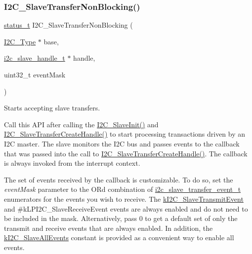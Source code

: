 \subsubsection{\texorpdfstring{I2C\_SlaveTransferNonBlocking()}{I2C\_SlaveTransferNonBlocking()}}
{\footnotesize\ttfamily \mbox{\hyperlink{group__ksdk__common_gaaabdaf7ee58ca7269bd4bf24efcde092}{status\+\_\+t}} I2\+C\+\_\+\+Slave\+Transfer\+Non\+Blocking (\begin{DoxyParamCaption}\item[{\mbox{\hyperlink{struct_i2_c___type}{I2\+C\+\_\+\+Type}} $\ast$}]{base,  }\item[{\mbox{\hyperlink{group__i2c__driver_ga394e5278816efe62815de9d25be84752}{i2c\+\_\+slave\+\_\+handle\+\_\+t}} $\ast$}]{handle,  }\item[{uint32\+\_\+t}]{event\+Mask }\end{DoxyParamCaption})}



Starts accepting slave transfers. 

Call this A\+PI after calling the \mbox{\hyperlink{group__i2c__driver_gaf2397a88554ea896f212dd262f9bc731}{I2\+C\+\_\+\+Slave\+Init()}} and \mbox{\hyperlink{group__i2c__driver_gac9b90f575d92ff8ad3cc350a5c8ad1b9}{I2\+C\+\_\+\+Slave\+Transfer\+Create\+Handle()}} to start processing transactions driven by an I2C master. The slave monitors the I2C bus and passes events to the callback that was passed into the call to \mbox{\hyperlink{group__i2c__driver_gac9b90f575d92ff8ad3cc350a5c8ad1b9}{I2\+C\+\_\+\+Slave\+Transfer\+Create\+Handle()}}. The callback is always invoked from the interrupt context.

The set of events received by the callback is customizable. To do so, set the {\itshape event\+Mask} parameter to the OR\textquotesingle{}d combination of \mbox{\hyperlink{group__i2c__driver_ga95f120f6a73af41648364538cf9a6eca}{i2c\+\_\+slave\+\_\+transfer\+\_\+event\+\_\+t}} enumerators for the events you wish to receive. The \mbox{\hyperlink{group__i2c__driver_gga87e42e170b60f17f657ef3c06a918133a2f85039a57379838909876a1d509b7aa}{k\+I2\+C\+\_\+\+Slave\+Transmit\+Event}} and \#k\+L\+P\+I2\+C\+\_\+\+Slave\+Receive\+Event events are always enabled and do not need to be included in the mask. Alternatively, pass 0 to get a default set of only the transmit and receive events that are always enabled. In addition, the \mbox{\hyperlink{group__i2c__driver_gga87e42e170b60f17f657ef3c06a918133a94b030ebdac378a84961893ae567bfbc}{k\+I2\+C\+\_\+\+Slave\+All\+Events}} constant is provided as a convenient way to enable all events.


